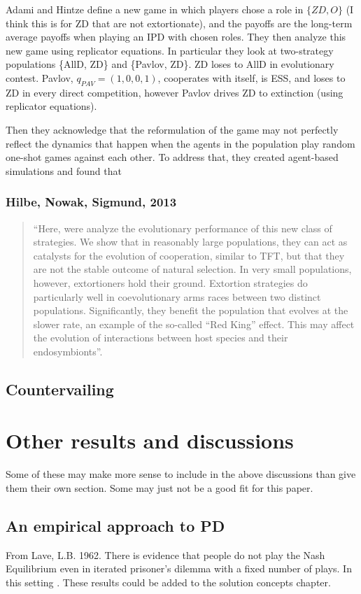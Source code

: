 Adami and Hintze define a new game in which players chose a role in $\{ZD, O\}$ (I think this is for ZD that are not extortionate), and the payoffs are the long-term average payoffs when playing an IPD with chosen roles. They then analyze this new game using replicator equations. In particular they look at two-strategy populations \{AllD, ZD\} and \{Pavlov, ZD\}. ZD loses to AllD in evolutionary contest. Pavlov, $q_{PAV} = (1, 0, 0, 1)$, cooperates with itself, is ESS, and loses to ZD in every direct competition, however Pavlov drives ZD to extinction (using replicator equations).

Then they acknowledge that the reformulation of the game may not perfectly reflect the dynamics that happen when the agents in the population play random one-shot games against each other. To address that, they created agent-based simulations and found that 


\subsection{Hilbe, Nowak, Sigmund, 2013}
\begin{quote}``Here, were analyze the evolutionary performance of this new class of strategies. We show that in reasonably large populations, they can act as catalysts for the evolution of cooperation, similar to TFT, but that they are not the stable outcome of natural selection. In very small populations, however, extortioners hold their ground. Extortion strategies do particularly well in coevolutionary arms races between two distinct populations. Significantly, they benefit the population that evolves at the slower rate, an example of the so-called ``Red King'' effect. This may affect the evolution of interactions between host species and their endosymbionts''.
\end{quote}

\section{Countervailing}

\chapter{Other results and discussions}
Some of these may make more sense to include in the above discussions than give them their own section. Some may just not be a good fit for this paper.
\section{An empirical approach to PD}
From Lave, L.B. 1962. There is evidence that people do not play the Nash Equilibrium even in iterated prisoner's dilemma with a fixed number of plays. In this setting . These results could be added to the solution concepts chapter.

